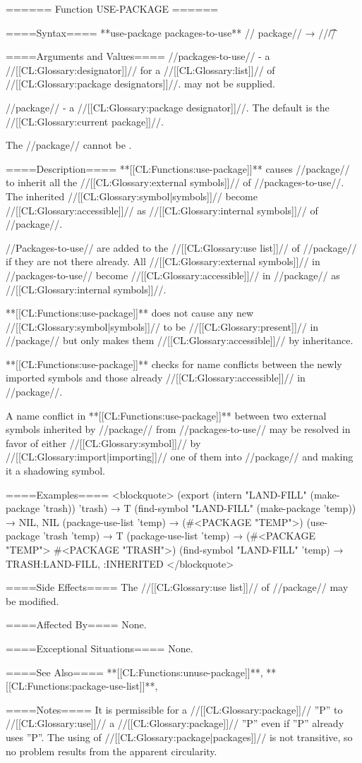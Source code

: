 ====== Function USE-PACKAGE ======

====Syntax====
**use-package {packages-to-use** //\opt} package// → //\t//

====Arguments and Values====
//packages-to-use// - a //[[CL:Glossary:designator]]// for a //[[CL:Glossary:list]]// of //[[CL:Glossary:package designators]]//.  may not be supplied.

//package// - a //[[CL:Glossary:package designator]]//. The default is the //[[CL:Glossary:current package]]//.

The //package// cannot be .

====Description====
**[[CL:Functions:use-package]]** causes //package// to inherit all the //[[CL:Glossary:external symbols]]// of //packages-to-use//. The inherited //[[CL:Glossary:symbol|symbols]]// become //[[CL:Glossary:accessible]]// as //[[CL:Glossary:internal symbols]]// of //package//.

//Packages-to-use// are added to the //[[CL:Glossary:use list]]// of //package// if they are not there already. All //[[CL:Glossary:external symbols]]// in //packages-to-use// become //[[CL:Glossary:accessible]]// in //package// as //[[CL:Glossary:internal symbols]]//.

**[[CL:Functions:use-package]]** does not cause any new //[[CL:Glossary:symbol|symbols]]// to be //[[CL:Glossary:present]]// in //package// but only makes them //[[CL:Glossary:accessible]]// by inheritance.

**[[CL:Functions:use-package]]** checks for name conflicts between the newly imported symbols and those already //[[CL:Glossary:accessible]]// in //package//.

A name conflict in **[[CL:Functions:use-package]]** between two external symbols inherited by //package// from //packages-to-use// may be resolved in favor of either //[[CL:Glossary:symbol]]// by //[[CL:Glossary:import|importing]]// one of them into //package// and making it a shadowing symbol.

====Examples====
<blockquote> (export (intern "LAND-FILL" (make-package 'trash)) 'trash) → T (find-symbol "LAND-FILL" (make-package 'temp)) → NIL, NIL (package-use-list 'temp) → (#<PACKAGE "TEMP">) (use-package 'trash 'temp) → T (package-use-list 'temp) → (#<PACKAGE "TEMP"> #<PACKAGE "TRASH">) (find-symbol "LAND-FILL" 'temp) → TRASH:LAND-FILL, :INHERITED </blockquote>

====Side Effects====
The //[[CL:Glossary:use list]]// of //package// may be modified.

====Affected By====
None.

====Exceptional Situations====
None.

====See Also====
**[[CL:Functions:unuse-package]]**, **[[CL:Functions:package-use-list]]**, {\secref\PackageConcepts}

====Notes====
It is permissible for a //[[CL:Glossary:package]]// ''P'' to //[[CL:Glossary:use]]// a //[[CL:Glossary:package]]// ''P'' even if ''P'' already uses ''P''. The using of //[[CL:Glossary:package|packages]]// is not transitive, so no problem results from the apparent circularity.


